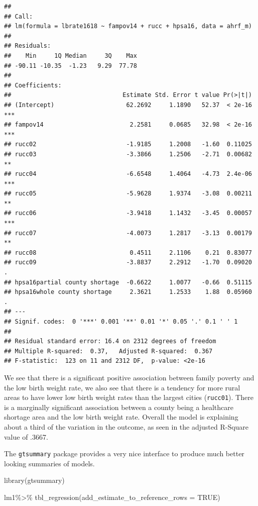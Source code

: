 \documentclass[
]{article}
\newenvironment{Shaded}{\begin{snugshade}}{\end{snugshade}}
\newcommand{\AttributeTok}[1]{\textcolor[rgb]{0.77,0.63,0.00}{#1}}
\newcommand{\ConstantTok}[1]{\textcolor[rgb]{0.00,0.00,0.00}{#1}}
\newcommand{\FunctionTok}[1]{\textcolor[rgb]{0.00,0.00,0.00}{#1}}
\newcommand{\NormalTok}[1]{#1}
\newcommand{\SpecialCharTok}[1]{\textcolor[rgb]{0.00,0.00,0.00}{#1}}
\begin{document}
\begin{verbatim}
## 
## Call:
## lm(formula = lbrate1618 ~ fampov14 + rucc + hpsa16, data = ahrf_m)
## 
## Residuals:
##    Min     1Q Median     3Q    Max 
## -90.11 -10.35  -1.23   9.29  77.78 
## 
## Coefficients:
##                               Estimate Std. Error t value Pr(>|t|)    
## (Intercept)                    62.2692     1.1890   52.37  < 2e-16 ***
## fampov14                        2.2581     0.0685   32.98  < 2e-16 ***
## rucc02                         -1.9185     1.2008   -1.60  0.11025    
## rucc03                         -3.3866     1.2506   -2.71  0.00682 ** 
## rucc04                         -6.6548     1.4064   -4.73  2.4e-06 ***
## rucc05                         -5.9628     1.9374   -3.08  0.00211 ** 
## rucc06                         -3.9418     1.1432   -3.45  0.00057 ***
## rucc07                         -4.0073     1.2817   -3.13  0.00179 ** 
## rucc08                          0.4511     2.1106    0.21  0.83077    
## rucc09                         -3.8837     2.2912   -1.70  0.09020 .  
## hpsa16partial county shortage  -0.6622     1.0077   -0.66  0.51115    
## hpsa16whole county shortage     2.3621     1.2533    1.88  0.05960 .  
## ---
## Signif. codes:  0 '***' 0.001 '**' 0.01 '*' 0.05 '.' 0.1 ' ' 1
## 
## Residual standard error: 16.4 on 2312 degrees of freedom
## Multiple R-squared:  0.37,   Adjusted R-squared:  0.367 
## F-statistic:  123 on 11 and 2312 DF,  p-value: <2e-16
\end{verbatim}

We see that there is a significant positive association between family poverty and the low birth weight rate, we also see that there is a tendency for more rural areas to have lower low birth weight rates than the largest cities (\texttt{rucc01}). There is a marginally significant association between a county being a healthcare shortage area and the low birth weight rate. Overall the model is explaining about a third of the variation in the outcome, as seen in the adjusted R-Square value of .3667.

The \texttt{gtsummary} package \citep{gtsummary} provides a very nice interface to produce much better looking summaries of models.

\begin{Shaded}
\begin{Highlighting}[]
\FunctionTok{library}\NormalTok{(gtsummary)}

\NormalTok{lm1}\SpecialCharTok{\%\textgreater{}\%}
  \FunctionTok{tbl\_regression}\NormalTok{(}\AttributeTok{add\_estimate\_to\_reference\_rows =} \ConstantTok{TRUE}\NormalTok{)}
\end{Highlighting}
\end{Shaded}
\end{document}
